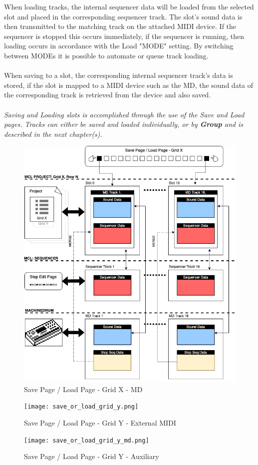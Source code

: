 When loading tracks, the internal sequencer data will be loaded from the selected slot and placed in the corresponding sequencer track. The slot's sound data is then transmitted to the matching track on the attached MIDI device. If the sequencer is stopped this occurs immediately, if the sequencer is running, then loading occurs in accordance with the Load "MODE" setting. By switching between MODEs it is possible to automate or queue track loading.
\\\\
When saving to a slot, the corresponding internal sequencer track's data is stored, if the slot is mapped to a MIDI device such as the MD, the sound data of the corresponding track is retrieved from the device and also saved.\\
\\
\textit{Saving and Loading slots is accomplished through the use of the Save and Load pages.  Tracks can either be saved and loaded individually, or by \textbf{Group} and is described in the next chapter(s).}
\newpage
\begin{figure}
    \centering
    \includegraphics[scale=0.7]{save_or_load_grid_x.png}
    \caption{Save Page / Load Page - Grid X - MD }
    \label{fig:my_label}
\end{figure}
\newpage
\begin{figure}
    \centering
    \texttt{[image: save\_or\_load\_grid\_y.png]}
    \caption{Save Page / Load Page - Grid Y - External MIDI}
    \label{fig:my_label}
\end{figure}
\newpage
\begin{figure}
    \centering
    \texttt{[image: save\_or\_load\_grid\_y\_md.png]}
    \caption{Save Page / Load Page - Grid Y - Auxiliary}
    \label{fig:my_label}
\end{figure}
